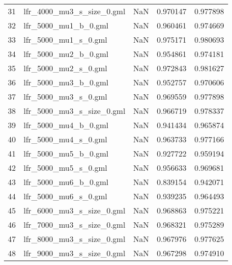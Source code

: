 \begin{tabular}{llrrr}
31 &   lfr\_4000\_mu3\_s\_size\_0.gml &                 NaN &                      0.970147 &                    0.977898 \\
32 &        lfr\_5000\_mu1\_b\_0.gml &                 NaN &                      0.960461 &                    0.974669 \\
33 &        lfr\_5000\_mu1\_s\_0.gml &                 NaN &                      0.975171 &                    0.980693 \\
34 &        lfr\_5000\_mu2\_b\_0.gml &                 NaN &                      0.954861 &                    0.974181 \\
35 &        lfr\_5000\_mu2\_s\_0.gml &                 NaN &                      0.972843 &                    0.981627 \\
36 &        lfr\_5000\_mu3\_b\_0.gml &                 NaN &                      0.952757 &                    0.970606 \\
37 &        lfr\_5000\_mu3\_s\_0.gml &                 NaN &                      0.969559 &                    0.977898 \\
38 &   lfr\_5000\_mu3\_s\_size\_0.gml &                 NaN &                      0.966719 &                    0.978337 \\
39 &        lfr\_5000\_mu4\_b\_0.gml &                 NaN &                      0.941434 &                    0.965874 \\
40 &        lfr\_5000\_mu4\_s\_0.gml &                 NaN &                      0.963733 &                    0.977166 \\
41 &        lfr\_5000\_mu5\_b\_0.gml &                 NaN &                      0.927722 &                    0.959194 \\
42 &        lfr\_5000\_mu5\_s\_0.gml &                 NaN &                      0.956633 &                    0.969681 \\
43 &        lfr\_5000\_mu6\_b\_0.gml &                 NaN &                      0.839154 &                    0.942071 \\
44 &        lfr\_5000\_mu6\_s\_0.gml &                 NaN &                      0.939235 &                    0.964493 \\
45 &   lfr\_6000\_mu3\_s\_size\_0.gml &                 NaN &                      0.968863 &                    0.975221 \\
46 &   lfr\_7000\_mu3\_s\_size\_0.gml &                 NaN &                      0.968321 &                    0.975289 \\
47 &   lfr\_8000\_mu3\_s\_size\_0.gml &                 NaN &                      0.967976 &                    0.977625 \\
48 &   lfr\_9000\_mu3\_s\_size\_0.gml &                 NaN &                      0.967298 &                    0.974910 \\
\bottomrule
\end{tabular}

